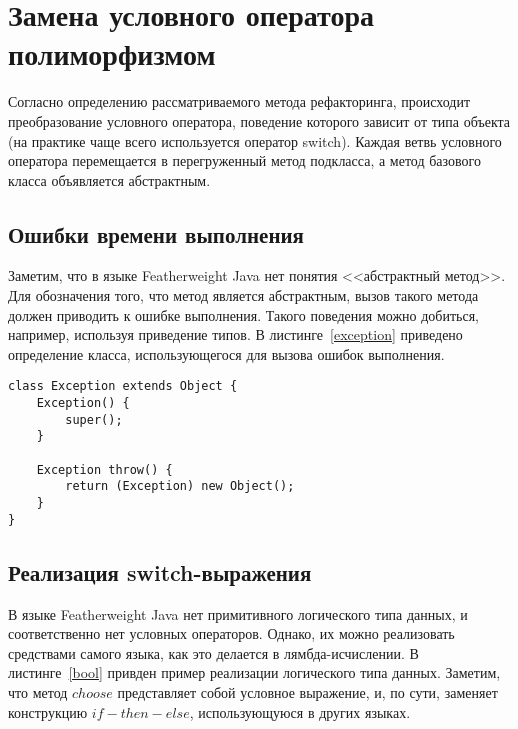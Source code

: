 \section{Замена условного оператора полиморфизмом}
Согласно определению рассматриваемого метода рефакторинга, происходит преобразование условного оператора, поведение которого зависит от типа объекта (на практике чаще всего используется оператор switch).
Каждая ветвь условного оператора перемещается в перегруженный метод подкласса, а метод базового класса объявляется абстрактным.

\subsection{Ошибки времени выполнения}
Заметим, что в языке Featherweight Java нет понятия <<абстрактный метод>>. Для обозначения того, что метод является абстрактным, вызов такого метода должен приводить к ошибке выполнения.
Такого поведения можно добиться, например, используя приведение типов. В листинге~\ref{exception} приведено определение класса, использующегося для вызова ошибок выполнения.
\begin{lstlisting}[float=htb,label=exception,caption=Определение класса Exception]
class Exception extends Object {
    Exception() {
        super();
    }

    Exception throw() {
        return (Exception) new Object();
    }
}
\end{lstlisting}

\subsection{Реализация switch-выражения}
В языке Featherweight Java нет примитивного логического типа данных, и соответственно нет условных операторов. Однако, их можно реализовать средствами самого языка, как это делается в лямбда-исчислении.
В листинге~\ref{bool} привден пример реализации логического типа данных. Заметим, что метод $choose$ представляет собой условное выражение, и, по сути, заменяет конструкцию $if-then-else$,
использующуюся в других языках.


